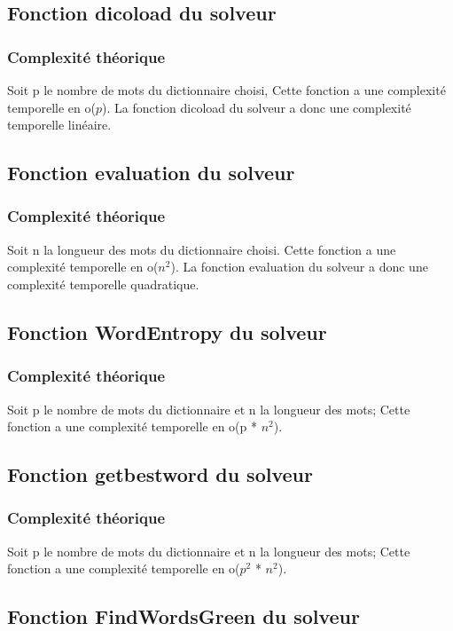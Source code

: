 \subsection{Fonction dicoload du solveur}
\subsubsection{Complexité théorique}
Soit p le nombre de mots du dictionnaire choisi, Cette fonction a une complexité temporelle en o($p$). La fonction dicoload du solveur a donc une complexité temporelle linéaire.

\subsection{Fonction evaluation du solveur}
\subsubsection{Complexité théorique}
Soit n la longueur des mots du dictionnaire choisi. Cette fonction a une complexité temporelle en o($n^2$). La fonction evaluation du solveur a donc une complexité temporelle quadratique.


\subsection{Fonction WordEntropy du solveur}
\subsubsection{Complexité théorique}
Soit p le nombre de mots du dictionnaire et n la longueur des mots; Cette fonction a une complexité temporelle en o(p * $n^2$).

\subsection{Fonction getbestword du solveur}
\subsubsection{Complexité théorique}
Soit p le nombre de mots du dictionnaire et n la longueur des mots; Cette fonction a une complexité temporelle en o($p^2$ * $n^2$).

\subsection{Fonction FindWordsGreen du solveur}
